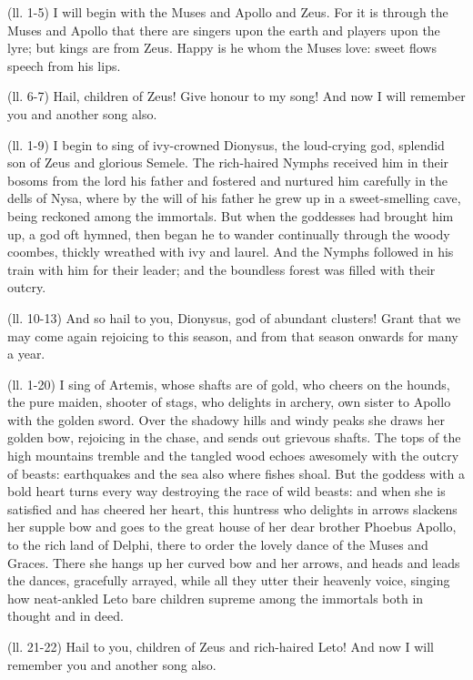 (ll. 1-5) I will begin with the Muses and Apollo and Zeus. For it is through
the Muses and Apollo that there are singers upon the earth and players upon the
lyre; but kings are from Zeus. Happy is he whom the Muses love: sweet flows
speech from his lips.

(ll. 6-7) Hail, children of Zeus! Give honour to my song! And now I will
remember you and another song also.


(ll. 1-9) I begin to sing of ivy-crowned Dionysus, the loud-crying god,
splendid son of Zeus and glorious Semele. The rich-haired Nymphs received him
in their bosoms from the lord his father and fostered and nurtured him
carefully in the dells of Nysa, where by the will of his father he grew up in a
sweet-smelling cave, being reckoned among the immortals. But when the goddesses
had brought him up, a god oft hymned, then began he to wander continually
through the woody coombes, thickly wreathed with ivy and laurel. And the Nymphs
followed in his train with him for their leader; and the boundless forest was
filled with their outcry.

(ll. 10-13) And so hail to you, Dionysus, god of abundant clusters! Grant that
we may come again rejoicing to this season, and from that season onwards for
many a year.


(ll. 1-20) I sing of Artemis, whose shafts are of gold, who cheers on the
hounds, the pure maiden, shooter of stags, who delights in archery, own sister
to Apollo with the golden sword. Over the shadowy hills and windy peaks she
draws her golden bow, rejoicing in the chase, and sends out grievous shafts.
The tops of the high mountains tremble and the tangled wood echoes awesomely
with the outcry of beasts: earthquakes and the sea also where fishes shoal. But
the goddess with a bold heart turns every way destroying the race of wild
beasts: and when she is satisfied and has cheered her heart, this huntress who
delights in arrows slackens her supple bow and goes to the great house of her
dear brother Phoebus Apollo, to the rich land of Delphi, there to order the
lovely dance of the Muses and Graces. There she hangs up her curved bow and her
arrows, and heads and leads the dances, gracefully arrayed, while all they
utter their heavenly voice, singing how neat-ankled Leto bare children supreme
among the immortals both in thought and in deed.

(ll. 21-22) Hail to you, children of Zeus and rich-haired Leto! And now I will
remember you and another song also.

